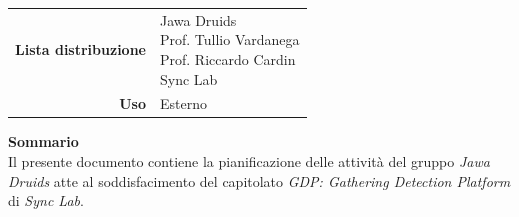 \begin{titlepage}
\begin{center}
\begin{table}[H]
\begin{tabular}{r | l}
				\textbf{Lista distribuzione} & \makecell[tl]{Jawa Druids \\ Prof. Tullio Vardanega \\ Prof. Riccardo Cardin \\ Sync Lab}\\
				\textbf{Uso} & Esterno
			\end{tabular}
		\end{table}
		\vspace{0.1cm}
		\hfill \break
		\fontsize{17}{10}\textbf{Sommario} \\
		\vspace{0.1cm}
    Il presente documento contiene la pianificazione delle attività del gruppo  \normalsize\textit{Jawa Druids} atte al soddisfacimento del capitolato \normalsize\textit{GDP: Gathering Detection Platform} di  \normalsize\textit{Sync Lab}.
	\end{center}
\end{titlepage}
\makeatother




\tableofcontents{}
\listoffigures
\listoftables











